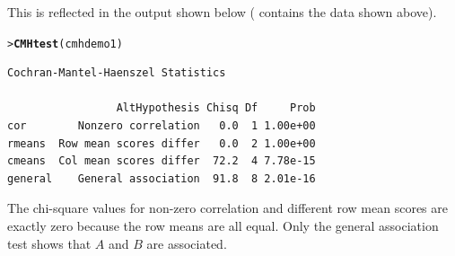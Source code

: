 \documentclass[10pt,krantz2]{krantz}\usepackage[]{graphicx}\usepackage[]{color}
\makeatletter
\newcommand{\hlstd}[1]{\textcolor[rgb]{0.345,0.345,0.345}{#1}}%
\newcommand{\hlkwd}[1]{\textcolor[rgb]{0.737,0.353,0.396}{\textbf{#1}}}%
\newenvironment{kframe}{%
 \def\at@end@of@kframe{}%
 \ifinner\ifhmode%
  \def\at@end@of@kframe{\end{minipage}}%
  \begin{minipage}{\columnwidth}%
 \fi\fi%
 \def\FrameCommand##1{\hskip\@totalleftmargin \hskip-\fboxsep
 \colorbox{shadecolor}{##1}\hskip-\fboxsep
     \hskip-\linewidth \hskip-\@totalleftmargin \hskip\columnwidth}%
 \MakeFramed {\advance\hsize-\width
   \@totalleftmargin\z@ \linewidth\hsize
   \@setminipage}}%
 {\par\unskip\endMakeFramed%
 \at@end@of@kframe}
\newenvironment{knitrout}{}{} %
\renewenvironment{knitrout}{\small\renewcommand{\baselinestretch}{.85}}{} %
\makeatother
\begin{document}



This is reflected in the  output shown below
( contains the data shown above).
\begin{knitrout}
\color{fgcolor}\begin{kframe}
\begin{alltt}
\hlstd{> }\hlkwd{CMHtest}\hlstd{(cmhdemo1)}
\end{alltt}
\begin{verbatim}
Cochran-Mantel-Haenszel Statistics 

                 AltHypothesis Chisq Df     Prob
cor        Nonzero correlation   0.0  1 1.00e+00
rmeans  Row mean scores differ   0.0  2 1.00e+00
cmeans  Col mean scores differ  72.2  4 7.78e-15
general    General association  91.8  8 2.01e-16
\end{verbatim}
\end{kframe}
\end{knitrout}

The chi-square values for non-zero correlation and different
row mean scores are exactly zero because the row means are all equal.
Only the general association test shows that $A$ and $B$
are associated.
\end{document}
